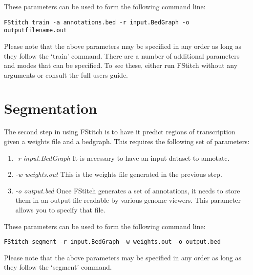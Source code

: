 \documentclass[12pt,letterpaper]{article}
\begin{document}
These parameters can be used to form the following command line:
\begin{verbatim}
FStitch train -a annotations.bed -r input.BedGraph -o outputfilename.out
\end{verbatim}

Please note that the above parameters may be specified in any order as long as they follow the `train' command.
There are a number of additional parameters and modes that can be specified. To see these, either run FStitch without any arguments or consult the full users guide.

\section{Segmentation}
The second step in using FStitch is to have it predict regions of transcription given a weights file and a bedgraph. This requires the following set of parameters:

\begin{enumerate}
 \item \textit{-r input.BedGraph} It is necessary to have an input dataset to annotate.
 \item \textit{-w weights.out} This is the weights file generated in the previous step.
 \item \textit{-o output.bed} Once FStitch generates a set of annotations, it needs to store them in an output file readable by various genome viewers. This parameter allows you to specify that file.
\end{enumerate}

These parameters can be used to form the following command line:
\begin{verbatim}
FStitch segment -r input.BedGraph -w weights.out -o output.bed
\end{verbatim}

Please note that the above parameters may be specified in any order as long as they follow the `segment' command.
\end{document}
